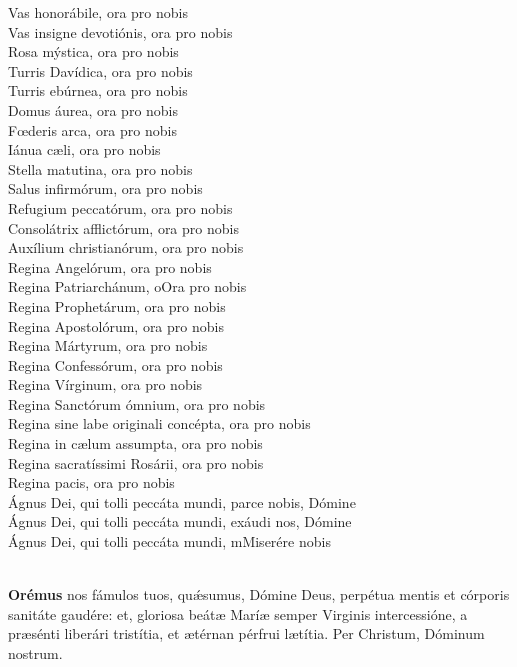 \documentclass[9pt]{article}
\begin{document}
\begin{multicols*}{2}
    Vas honorábile, ora pro nobis\\
    Vas insigne devotiónis, ora pro nobis\\
    Rosa mýstica, ora pro nobis\\
    Turris Davídica, ora pro nobis\\
    Turris ebúrnea, ora pro nobis\\
    Domus áurea, ora pro nobis\\
    F{\oe}deris arca, ora pro nobis\\
    Iánua cæli, ora pro nobis\\
    Stella matutina, ora pro nobis\\
    Salus infirmórum, ora pro nobis\\
    Refugium peccatórum, ora pro nobis\\
    Consolátrix afflictórum, ora pro nobis\\
    Auxílium christianórum, ora pro nobis\\
    Regina Angelórum, ora pro nobis\\
    Regina Patriarchánum, oOra pro nobis\\
    Regina Prophetárum, ora pro nobis\\
    Regina Apostolórum, ora pro nobis\\
    Regina Mártyrum, ora pro nobis\\
    Regina Confessórum, ora pro nobis\\
    Regina Vírginum, ora pro nobis\\
    Regina Sanctórum ómnium, ora pro nobis\\
    Regina sine labe originali concépta, ora pro nobis\\
    Regina in c{\ae}lum assumpta, ora pro nobis\\
    Regina sacratíssimi Rosárii, ora pro nobis\\
    Regina pacis, ora pro nobis\\
    Ágnus Dei, qui tolli peccáta mundi, parce nobis, Dómine\\
    Ágnus Dei, qui tolli peccáta mundi, exáudi nos, Dómine\\
    Ágnus Dei, qui tolli peccáta mundi, mMiserére nobis\\
    \orapronobissalve\\

    \newpage

    \textbf{Orémus}
     nos fámulos tuos, qu{\'\ae}sumus, Dómine Deus, perpétua mentis et córporis sanitáte gaudére: et, gloriosa beát{\ae}
    Marí{\ae} semper Virginis intercessióne, a pr{\ae}sénti liberári tristítia, et {\ae}térnan pérfrui l{\ae}títia. Per Christum, Dóminum nostrum.
    \\


\end{multicols*}
\end{document}
